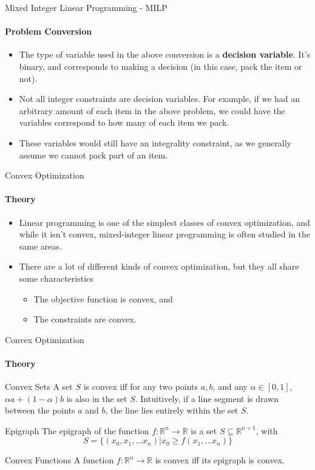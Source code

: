 \documentclass{beamer}
\begin{document}
	\begin{frame}{Mixed Integer Linear Programming - MILP}
		\framesubtitle{Problem Conversion}
		\begin{itemize}
			\item The type of variable used in the above conversion is a \textbf{decision variable}. It's binary, and corresponds to making a decision (in this case, pack the item or not).
			\item Not all integer constraints are decision variables. For example, if we had an arbitrary amount of each item in the above problem, we could have the variables correspond to how many of each item we pack.
			\item These variables would still have an integrality constraint, as we generally assume we cannot pack part of an item.
		\end{itemize}
	\end{frame}
	
	\begin{frame}{Convex Optimization}
		\framesubtitle{Theory}
		\begin{itemize}
			\item Linear programming is one of the simplest classes of convex optimization, and while it isn't convex, mixed-integer linear programming is often studied in the same areas.
			\item There are a lot of different kinds of convex optimization, but they all share some characteristics
			\begin{itemize}
				\item The objective function is convex, and
				\item The constraints are convex.
			\end{itemize}
		\end{itemize}
	\end{frame}

	\begin{frame}{Convex Optimization}
		\framesubtitle{Theory}
		\begin{block}{Convex Sets}
			A set $S$ is convex iff for any two points $a, b$, and any $\alpha\in[0,1]$, $\alpha a + (1-\alpha)b$ is also in the set $S$. Intuitively, if a line segment is drawn between the points $a$ and $b$, the line lies entirely within the set $S$.
		\end{block}
		\begin{block}{Epigraph}
			The epigraph of the function $f: \mathbb{R}^n\to\mathbb{R}$ is a set $S\subseteq\mathbb{R}^{n+1}$, with \[
				S = \{(x_0,x_1,...x_n) | x_0 \geq f(x_1,...x_n)\}
			\]
		\end{block}
		\begin{block}{Convex Functions}
			A function $f: \mathbb{R}^n\to\mathbb{R}$ is convex iff its epigraph is convex.
		\end{block}
	\end{frame}
\end{document}
